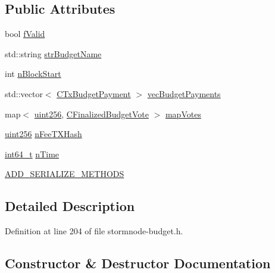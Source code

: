 \subsection*{Public Attributes}
\begin{DoxyCompactItemize}
\item 
bool \hyperlink{class_c_finalized_budget_a00d9e3055bebaaef28543bd67e4ca162}{f\+Valid}
\item 
std\+::string \hyperlink{class_c_finalized_budget_ae2a467abad2985ff3c32b29fc75500aa}{str\+Budget\+Name}
\item 
int \hyperlink{class_c_finalized_budget_a1d04c262e10f4588b17eb3aba5ed9b52}{n\+Block\+Start}
\item 
std\+::vector$<$ \hyperlink{class_c_tx_budget_payment}{C\+Tx\+Budget\+Payment} $>$ \hyperlink{class_c_finalized_budget_a639e7be9254d99deb42aeeb15de63174}{vec\+Budget\+Payments}
\item 
map$<$ \hyperlink{classuint256}{uint256}, \hyperlink{class_c_finalized_budget_vote}{C\+Finalized\+Budget\+Vote} $>$ \hyperlink{class_c_finalized_budget_a756460095ed59fd39e7f3018b4b208dd}{map\+Votes}
\item 
\hyperlink{classuint256}{uint256} \hyperlink{class_c_finalized_budget_a699a2f3cbea723957c2a944b08484bb5}{n\+Fee\+T\+X\+Hash}
\item 
\hyperlink{stdint_8h_adec1df1b8b51cb32b77e5b86fff46471}{int64\+\_\+t} \hyperlink{class_c_finalized_budget_a3bb3cb1d44021d5ef9996a81f3e09734}{n\+Time}
\item 
\hyperlink{class_c_finalized_budget_ad426a5e67867bcb8f73df4aef50ac588}{A\+D\+D\+\_\+\+S\+E\+R\+I\+A\+L\+I\+Z\+E\+\_\+\+M\+E\+T\+H\+O\+D\+S}
\end{DoxyCompactItemize}


\subsection{Detailed Description}


Definition at line 204 of file stormnode-\/budget.\+h.



\subsection{Constructor \& Destructor Documentation}
\hypertarget{class_c_finalized_budget_a70a5842e7be58407c5ff5daade0e6e45}{}
